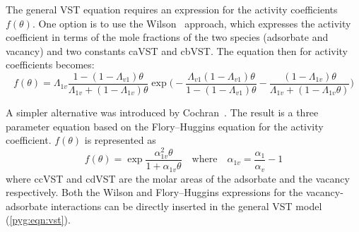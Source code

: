 The general \gls{VST} equation requires an expression for the activity
coefficients \(f(\theta)\). One option is to use the
Wilson~\cite{suwanayuenGasAdsorptionIsotherm1980} approach,
which expresses the activity coefficient in terms
of the mole fractions of the two species (adsorbate and vacancy) and
two constants \gls{caVST} and \gls{cbVST}. The equation
then for activity coefficients becomes:
%
\begin{equation}\label{pyg:eqn:wvst}
	f(\theta) = \Lambda_{1v}
	\frac{1-(1-\Lambda_{v1})\theta}{\Lambda_{1v}+(1-\Lambda_{1v})\theta}
	\exp{\bigg(
		-\frac{\Lambda_{v1}(1-\Lambda_{v1})\theta}{1-(1-\Lambda_{v1})\theta}
		-\frac{(1 - \Lambda_{1v})\theta}{\Lambda_{1v} +
			(1-\Lambda_{1v}\theta)} \bigg)}
\end{equation}

A simpler alternative was introduced by
Cochran~\cite{cochranVacancySolutionTheory1985}. The result is a
three parameter equation based on the Flory–Huggins equation for the
activity coefficient. \(f(\theta)\) is represented as
%
\begin{equation}\label{pyg:eqn:fhvst}
	f(\theta) =
	\exp{\frac{\alpha^2_{1v}\theta}{1+\alpha_{1v}\theta}}
	\quad \text{where} \quad
	\alpha_{1v} = \frac{\alpha_{1}}{\alpha_{v}} - 1
\end{equation}
%
where \gls{ccVST} and \gls{cdVST} are the molar areas of the
adsorbate and the vacancy respectively.
Both the Wilson and Flory–Huggins expressions for the vacancy-adsorbate
interactions can be directly inserted in the general \gls{VST} model
(\autoref{pyg:eqn:vst}).
